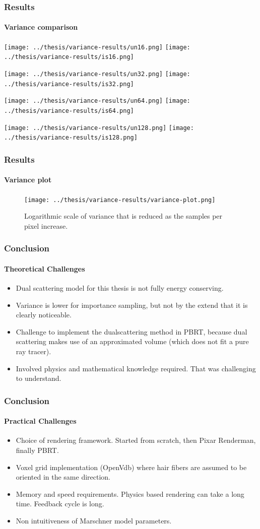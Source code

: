 \documentclass{beamer}
\begin{document}
  \begin{frame}
    \frametitle{Results}
    \framesubtitle{Variance comparison}
    \centering

    \texttt{[image: ../thesis/variance-results/un16.png]} 
    \texttt{[image: ../thesis/variance-results/is16.png]}
        
    \texttt{[image: ../thesis/variance-results/un32.png]} 
    \texttt{[image: ../thesis/variance-results/is32.png]}
    
    \texttt{[image: ../thesis/variance-results/un64.png]} 
    \texttt{[image: ../thesis/variance-results/is64.png]}
    
    \texttt{[image: ../thesis/variance-results/un128.png]} 
    \texttt{[image: ../thesis/variance-results/is128.png]}
    
  \end{frame}
  
\begin{frame}
    \frametitle{Results}
    \framesubtitle{Variance plot}
    
    \begin{figure}
    \centering
    \texttt{[image: ../thesis/variance-results/variance-plot.png]} 
    \caption{Logarithmic scale of variance that is reduced as the samples per pixel increase.}
    \end{figure}
  \end{frame}
  
  
  \begin{frame}
    \frametitle{Conclusion}
    \framesubtitle{Theoretical Challenges}
	
	\begin{itemize}
	\item Dual scattering model for this thesis is not fully energy conserving.
	\item Variance is lower for importance sampling, but not by the extend that it is clearly noticeable.
	\item Challenge to implement the dualscattering method in PBRT, because dual scattering makes use of an approximated volume (which does not fit a pure ray tracer).
	\item Involved physics and mathematical knowledge required. That was challenging to understand.
	\end{itemize}
  \end{frame}
  
  \begin{frame}
    \frametitle{Conclusion}
    \framesubtitle{Practical Challenges}
	
	\begin{itemize}
	\item Choice of rendering framework. Started from scratch, then Pixar Renderman, finally PBRT.
	\item Voxel grid implementation (OpenVdb) where hair fibers are assumed to be oriented in the same direction.
	\item Memory and speed requirements. Physics based rendering can take a long time. Feedback cycle is long.
	\item Non intuitiveness of Marschner model parameters.
	\end{itemize}
  \end{frame}
  
\end{document}
